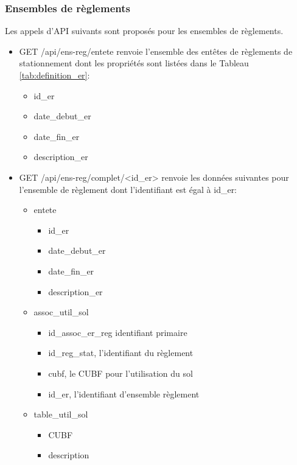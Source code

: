 \subsubsection{Ensembles de règlements}
Les appels d'\ac{API} suivants sont proposés pour les ensembles de règlements.
\begin{itemize}
    \item GET /api/ens-reg/entete renvoie l'ensemble des entêtes de règlements de stationnement dont les propriétés sont listées dans le Tableau \ref{tab:definition_er}:
    \begin{itemize}
        \item id\_er 
        \item date\_debut\_er
        \item date\_fin\_er
        \item description\_er
    \end{itemize}
    \item GET /api/ens-reg/complet/<id\_er> renvoie  les données suivantes pour l'ensemble de règlement dont l'identifiant est égal à id\_er:
        \begin{itemize}
            \item entete
                \begin{itemize}
                    \item id\_er
                    \item date\_debut\_er
                    \item date\_fin\_er
                    \item description\_er
                \end{itemize}
            \item assoc\_util\_sol
                \begin{itemize}
                    \item id\_assoc\_er\_reg identifiant primaire
                    \item id\_reg\_stat, l'identifiant du règlement
                    \item cubf, le \ac{CUBF} pour l'utilisation du sol
                    \item id\_er, l'identifiant d'ensemble règlement
                \end{itemize}
            \item table\_util\_sol
                \begin{itemize}
                    \item \ac{CUBF}
                    \item description

\end{itemize}
\end{itemize}
\end{itemize}
